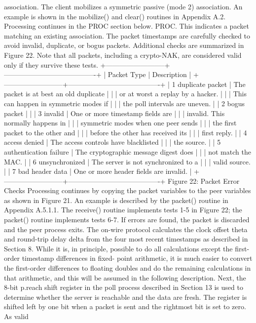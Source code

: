  association. The client mobilizes a symmetric passive (mode 2)
 association. An example is shown in the mobilize() and clear()
 routines in Appendix A.2. Processing continues in the PROC section
 below.
 PROC. This indicates a packet matching an existing association. The
 packet timestamps are carefully checked to avoid invalid, duplicate,
 or bogus packets. Additional checks are summarized in Figure 22.
 Note that all packets, including a crypto-NAK, are considered valid
 only if they survive these tests.
 +--------------------------+----------------------------------------+
 | Packet Type | Description |
 +--------------------------+----------------------------------------+
 | 1 duplicate packet | The packet is at best an old duplicate |
 | | or at worst a replay by a hacker. |
 | | This can happen in symmetric modes if |
 | | the poll intervals are uneven. |
 | 2 bogus packet | |
 | 3 invalid | One or more timestamp fields are |
 | | invalid. This normally happens in |
 | | symmetric modes when one peer sends |
 | | the first packet to the other and |
 | | before the other has received its |
 | | first reply. |
 | 4 access denied | The access controls have blacklisted |
 | | the source. |
 | 5 authentication failure | The cryptographic message digest does |
 | | not match the MAC. |
 | 6 unsynchronized | The server is not synchronized to a |
 | | valid source. |
 | 7 bad header data | One or more header fields are invalid. |
 +--------------------------+----------------------------------------+
 Figure 22: Packet Error Checks
 Processing continues by copying the packet variables to the peer
 variables as shown in Figure 21. An example is described by the
 packet() routine in Appendix A.5.1.1. The receive() routine
 implements tests 1-5 in Figure 22; the packet() routine implements
 tests 6-7. If errors are found, the packet is discarded and the peer
 process exits.
 The on-wire protocol calculates the clock offset theta and round-trip
 delay delta from the four most recent timestamps as described in
 Section 8. While it is, in principle, possible to do all
 calculations except the first-order timestamp differences in fixed-
 point arithmetic, it is much easier to convert the first-order
 differences to floating doubles and do the remaining calculations in
 that arithmetic, and this will be assumed in the following
 description.
 Next, the 8-bit p.reach shift register in the poll process described
 in Section 13 is used to determine whether the server is reachable
 and the data are fresh. The register is shifted left by one bit when
 a packet is sent and the rightmost bit is set to zero. As valid
